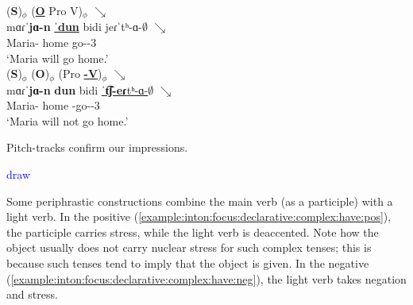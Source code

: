 \begin{exe}
	\ex \begin{xlist}
		\ex \glll   (\textbf{S})$_\phi$ (\underline{\textbf{O}} Pro V)$_\phi$ $\searrow$ \\
		mɑɾˈ\textbf{jɑ-n} \underline{ˈ\textbf{dun}} bidi jeɾˈtʰ-ɑ-$\emptyset$   $\searrow$ \\
		Maria-{} home {\fut} go-{\thgloss}-3{\sg} \\
		\trans `Maria will go home.'
		\label{example:inton:focus:declarative:complex:fut:pos}
		\\  
		\ex \glll   (\textbf{S})$_\phi$ ({\textbf{O}})$_\phi$ (Pro \underline{\textbf{{\neggloss}-V}})$_\phi$ $\searrow$ \\
		mɑɾˈ\textbf{jɑ-n} {\textbf{dun}} bidi \underline{ˈ\textbf{t͡ʃ-eɾ}tʰ-ɑ-$\emptyset$}     $\searrow$ \\
		Maria-{} home  {\fut}  {\neggloss}-go-{\thgloss}-3{\sg} \\ 
		\trans `Maria will not go home.'
		\label{example:inton:focus:declarative:complex:fut:neg}
		\\  
		
	\end{xlist}
\end{exe}

Pitch-tracks confirm our impressions. 

\textcolor{blue}{draw}

Some periphrastic constructions combine the main verb (as a participle) with a light verb. In the positive (\ref{example:inton:focus:declarative:complex:have:pos}), the participle    carries stress, while the light verb is deaccented. Note how the object usually does not carry nuclear stress for such complex tenses; this is because such tenses tend to imply that the object is given. In the negative (\ref{example:inton:focus:declarative:complex:have:neg}), the  light verb takes negation and stress. 

